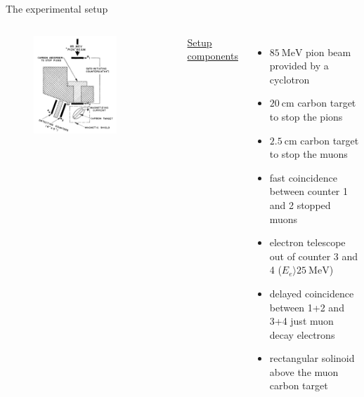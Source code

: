 \documentclass[aspectratio=1610, 10pt]{beamer}
\begin{document}
\begin{frame}{The experimental setup}
	\begin{columns}
		\begin{figure}
			\includegraphics[width=0.75\textwidth]{images/muon_setup.png}
		\end{figure}
		\underline{Setup components}
		\begin{itemize}
			\item $\SI{85}{\mega\electronvolt}$ pion beam provided by a cyclotron
			\item $\SI{20}{\centi\meter}$ carbon target to stop the pions
			\item $\SI{2.5}{\centi\meter}$ carbon target to stop the muons
			\item fast coincidence between counter 1 and 2 \textrightarrow stopped muons
			\item electron telescope out of counter 3 and 4 ($E_{e} \rangle \SI{25}{\mega\electronvolt}$)
			\item delayed coincidence between 1+2 and 3+4 \textrightarrow just muon decay electrons
			\item rectangular solinoid above the muon carbon target
		\end{itemize}
	\end{columns}
\end{frame}
\end{document}
